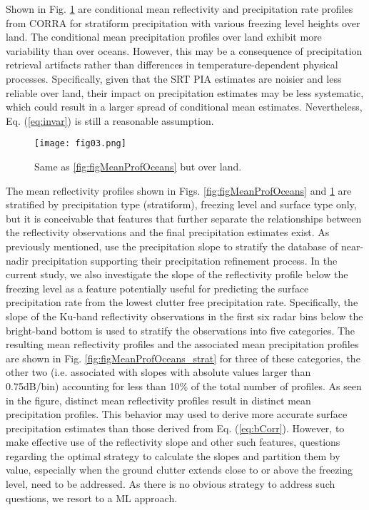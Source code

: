 \documentclass{ametsocV6.1} %
\begin{document}
Shown in Fig. \ref{fig:figMeanProfLand} are conditional mean reflectivity and precipitation rate profiles from CORRA for stratiform precipitation with various freezing level heights over land. The conditional mean precipitation profiles over land exhibit more variability than over oceans. However, this may be a consequence of precipitation retrieval artifacts rather than differences in temperature-dependent physical processes.  Specifically, given that the SRT PIA estimates are noisier and less reliable over land, their impact on precipitation estimates may be less systematic, which could result in a larger spread of conditional mean estimates.  Nevertheless, Eq. (\ref{eq:invar}) is still a reasonable assumption.

\begin{figure}[h]
    \centering
    \texttt{[image: fig03.png]}
    \caption{Same as \ref{fig:figMeanProfOceans} but over land.}
    \label{fig:figMeanProfLand}
\end{figure}
The mean reflectivity profiles shown in Figs. \ref{fig:figMeanProfOceans} and \ref{fig:figMeanProfLand} are stratified by precipitation type (stratiform), freezing level and surface type only, but it is conceivable that features that further separate the relationships between the reflectivity observations and the final precipitation estimates exist.  As previously mentioned, \cite{hirose2021} use the precipitation slope to stratify the database of near-nadir precipitation supporting their precipitation refinement process.  In the current study, we also investigate the slope of the reflectivity profile below the freezing level as a feature potentially useful for predicting the surface precipitation rate from the lowest clutter free precipitation rate.  Specifically, the slope of the Ku-band reflectivity observations in the first six radar bins below the bright-band bottom \cite{iguchi_atbd} is used to stratify the observations into five categories.  The resulting mean reflectivity profiles and the associated mean precipitation profiles are shown in Fig. \ref{fig:figMeanProfOceans_strat} for three of these categories, the other two (i.e. associated with slopes with absolute values larger than 0.75dB/bin) accounting for less than 10\% of the total number of profiles. As seen in the figure, distinct mean reflectivity profiles result in distinct mean precipitation profiles.  This behavior may used to derive more accurate surface precipitation estimates than those derived from Eq. (\ref{eq:bCorr}).  However, to make effective use of the reflectivity slope and other such features, questions regarding the optimal strategy to calculate the slopes and partition them by value, especially when the ground clutter extends close to or above the freezing level, need to be addressed. As there is no obvious strategy to address such questions, we resort to a ML approach.
\end{document}
